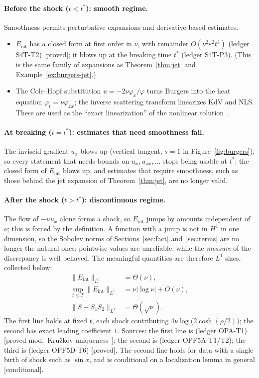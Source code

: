 \documentclass[11pt,a4paper]{article}
\theoremstyle{definition}
\newcommand{\badge}[2]{\textcolor{#1}{\textsf{\footnotesize[#2]}}}
\newcommand{\proved}[1][]{\badge{cC}{proved#1}}
\newcommand{\modulo}[1]{\badge{cD}{proved mod.\ #1}}
\newcommand{\condl}{\badge{cD}{conditional}}
\newcommand{\led}[1]{\textcolor{cG}{\textsf{\footnotesize(ledger #1)}}}
\newcommand{\Eint}{E_{\mathrm{int}}}
\begin{document}
\paragraph{Before the shock ($t<t^*$): smooth regime.} Smoothness permits perturbative expansions and derivative-based estimates.
\begin{itemize}[nosep]
\item $\Eint$ has a closed form at first order in $\nu$, with remainder $O(\nu^2\varepsilon^2t^3)$ \led{S4T-T2} \proved; it blows up at the breaking time $t^*$ \led{S4T-P3}. (This is the same family of expansions as Theorem~\ref{thm:jet} and Example~\ref{ex:burgers-jet}.)
\item The Cole--Hopf substitution $u=-2\nu\varphi_x/\varphi$ turns Burgers into the heat equation $\varphi_t=\nu\varphi_{xx}$; the inverse scattering transform linearizes KdV and NLS. These are used as the ``exact linearization'' of the nonlinear solution~\cite{ch}.
\end{itemize}
\paragraph{At breaking ($t=t^*$): estimates that need smoothness fail.} The inviscid gradient $u_x$ blows up (vertical tangent, $s=1$ in Figure~\ref{fig:burgers}), so every statement that needs bounds on $u_x,u_{xx},\dots$ stops being usable at $t^*$: the closed form of $\Eint$ blows up, and estimates that require smoothness, such as those behind the jet expansion of Theorem~\ref{thm:jet}, are no longer valid.
\paragraph{After the shock ($t>t^*$): discontinuous regime.}
The flow of $-uu_x$ alone forms a shock, so $\Eint$ jumps by amounts independent of $\nu$; this is forced by the definition. A function with a jump is not in $H^1$ in one dimension, so the Sobolev norms of Sections~\ref{sec:fact} and~\ref{sec:terms} are no longer the natural ones: pointwise values are unreliable, while the \emph{measure} of the discrepancy is well behaved. The meaningful quantities are therefore $L^1$ sizes, collected below:
\begin{align}
\|\Eint\|_{L^1}&=\Theta(\nu),\\
\sup_{t\le T}\|\Eint\|_{L^1}&=\nu|\log\nu|+O(\nu),\\
\|S-S_1S_2\|_{L^1}&=\Theta(\sqrt\nu).
\end{align}
The first line holds at fixed $t$, each shock contributing $4\nu\log\!\big(2\cosh(\rho/2)\big)$; the second has exact leading coefficient $1$. Sources: the first line is \led{OPA-T1} \modulo{Kru\v zkov uniqueness~\cite{kr}}; the second is \led{OPF5A-T1/T2}; the third is \led{OPF5D-T6} \proved.
The second line holds for data with a single birth of shock such as $\sin x$, and is conditional on a localization lemma in general \condl{}.
\end{document}
